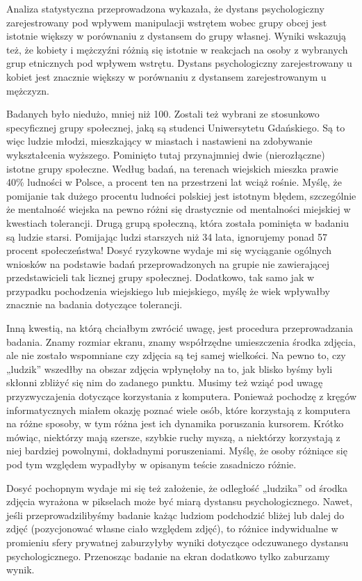 \documentclass{psychol}
\begin{document}
Analiza statystyczna przeprowadzona wykazała, że dystans psychologiczny zarejestrowany pod wpływem manipulacji
wstrętem wobec grupy obcej jest istotnie większy w porównaniu z dystansem do grupy
własnej. Wyniki wskazują też, że kobiety i mężczyźni różnią się istotnie w reakcjach na osoby z wybranych grup etnicznych pod wpływem wstrętu. Dystans psychologiczny zarejestrowany u kobiet jest znacznie większy w porównaniu z dystansem zarejestrowanym
u mężczyzn.


Badanych było niedużo, mniej niż 100. Zostali też wybrani ze stosunkowo specyficznej grupy społecznej, jaką są studenci Uniwersytetu Gdańskiego. Są to więc ludzie młodzi, mieszkający w miastach i nastawieni na zdobywanie wykształcenia wyższego. Pominięto tutaj przynajmniej dwie (nierozłączne) istotne grupy społeczne. Według badań, na terenach wiejskich mieszka prawie 40\% ludności w Polsce, a procent ten na przestrzeni lat wciąż rośnie. Myślę, że pomijanie tak dużego procentu ludności polskiej jest istotnym błędem, szczególnie że mentalność wiejska na pewno różni się drastycznie od mentalności miejskiej w kwestiach tolerancji. Drugą grupą społeczną, która została pominięta w badaniu są ludzie starsi. Pomijając ludzi starszych niż 34 lata, ignorujemy ponad 57 procent społeczeństwa! Dosyć ryzykowne wydaje mi się wyciąganie ogólnych wniosków na podstawie badań przeprowadzonych na grupie nie zawierającej przedstawicieli tak licznej grupy społecznej. Dodatkowo, tak samo jak w przypadku pochodzenia wiejskiego lub miejskiego, myślę że wiek wpływałby znacznie na badania dotyczące tolerancji.

Inną kwestią, na którą chciałbym zwrócić uwagę, jest procedura przeprowadzania badania. Znamy rozmiar ekranu, znamy współrzędne umieszczenia środka zdjęcia, ale nie zostało wspomniane czy zdjęcia są tej samej wielkości. Na pewno to, czy „ludzik” wszedłby na obszar zdjęcia wpłynęłoby na to, jak blisko byśmy byli skłonni zbliżyć się nim do zadanego punktu. Musimy też wziąć pod uwagę przyzwyczajenia dotyczące korzystania z komputera. Ponieważ pochodzę z kręgów informatycznych miałem okazję poznać wiele osób, które korzystają z komputera na różne sposoby, w tym różna jest ich dynamika poruszania kursorem. Krótko mówiąc, niektórzy mają szersze, szybkie ruchy myszą, a niektórzy korzystają z niej bardziej powolnymi, dokładnymi poruszeniami. Myślę, że osoby różniące się pod tym względem wypadłyby w opisanym teście zasadniczo różnie.

Dosyć pochopnym wydaje mi się też założenie, że odległość „ludzika” od środka zdjęcia wyrażona w pikselach może być miarą dystansu psychologicznego. Nawet, jeśli przeprowadzilibyśmy badanie każąc ludziom podchodzić bliżej lub dalej do zdjęć (pozycjonować własne ciało względem zdjęć), to różnice indywidualne w promieniu sfery prywatnej zaburzyłyby wyniki dotyczące odczuwanego dystansu psychologicznego. Przenosząc badanie na ekran dodatkowo tylko zaburzamy wynik.
\end{document}
